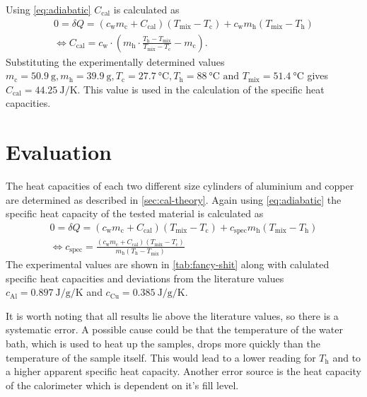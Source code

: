 Using \autoref{eq:adiabatic} $C_\text{cal}$ is calculated as
\begin{gather*}
	0 = \delta Q = \left(c_\text{w} m_\text{c} + C_\text{cal}\right) \left(T_\text{mix} - T_\text{c}\right) + c_\text{w} m_\text{h} \left(T_\text{mix} - T_\text{h}\right)\\
	\Leftrightarrow C_\text{cal} = c_\text{w} \cdot \left(m_\text{h} \cdot  \frac{T_\text{h} - T_\text{mix}}{T_\text{mix} - T_\text{c}} - m_\text{c}\right).
\end{gather*}
Substituting the experimentally determined values $m_\text{c} = \SI{50.9}{\gram}, m_\text{h} = \SI{39.9}{\gram}, T_\text{c} = \SI{27.7}{\celsius}, T_\text{h} = \SI{88}{\celsius} \text{ and } T_\text{mix} = \SI{51.4}{\celsius}$ gives $C_\text{cal} = \SI{44.25}{\joule\per\kelvin}$.
This value is used in the calculation of the specific heat capacities.

\section{Evaluation}
The heat capacities of each two different size cylinders of aluminium and copper are determined as described in \autoref{sec:cal-theory}.
Again using \autoref{eq:adiabatic} the specific heat capacity of the tested material is calculated as
\begin{gather*}
	0 = \delta Q = \left(c_\text{w} m_\text{c} + C_\text{cal}\right) \left(T_\text{mix} - T_\text{c}\right) + c_\text{spec} m_\text{h} \left(T_\text{mix} - T_\text{h}\right)\\
	\Leftrightarrow c_\text{spec} = \frac{\left(c_\text{w} m_\text{c} + C_\text{cal}\right) \left(T_\text{mix} - T_\text{c}\right)}{m_\text{h} \left(T_\text{h} - T_\text{mix}\right)}
\end{gather*}
The experimental values are shown in \autoref{tab:fancy-shit} along with calulated specific heat capacities and deviations from the literature values $c_\text{Al} = \SI{0.897}{\joule\per\gram\per\kelvin}$ and $c_\text{Cu} = \SI{0.385}{\joule\per\gram\per\kelvin}$.

It is worth noting that all results lie above the literature values, so there is a systematic error.
A possible cause could be that the temperature of the water bath, which is used to heat up the samples, drops more quickly than the temperature of the sample itself.
This would lead to a lower reading for $T_\text{h}$ and to a higher apparent specific heat capacity.
Another error source is the heat capacity of the calorimeter which is dependent on it's fill level.

